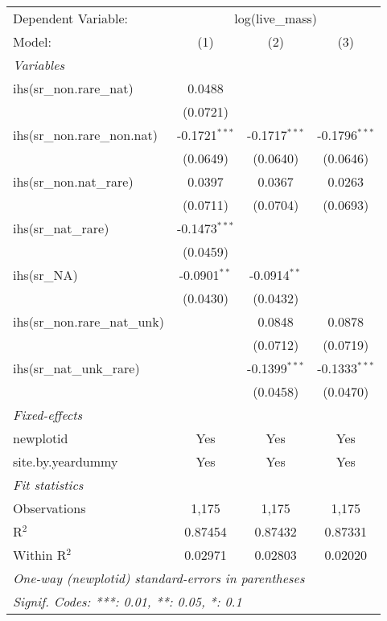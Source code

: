 \begin{tabular}{lccc}
\tabularnewline\midrule\midrule
Dependent Variable:&\multicolumn{3}{c}{log(live\_mass)}\\
Model:&(1) & (2) & (3)\\
\midrule \emph{Variables}&   &   &  \\
ihs(sr\_non.rare\_nat)&0.0488 &    &   \\
  &(0.0721) &    &   \\
ihs(sr\_non.rare\_non.nat)&-0.1721$^{***}$ & -0.1717$^{***}$ & -0.1796$^{***}$\\
  &(0.0649) & (0.0640) & (0.0646)\\
ihs(sr\_non.nat\_rare)&0.0397 & 0.0367 & 0.0263\\
  &(0.0711) & (0.0704) & (0.0693)\\
ihs(sr\_nat\_rare)&-0.1473$^{***}$ &    &   \\
  &(0.0459) &    &   \\
ihs(sr\_NA)&-0.0901$^{**}$ & -0.0914$^{**}$ &   \\
  &(0.0430) & (0.0432) &   \\
ihs(sr\_non.rare\_nat\_unk)&   & 0.0848 & 0.0878\\
  &   & (0.0712) & (0.0719)\\
ihs(sr\_nat\_unk\_rare)&   & -0.1399$^{***}$ & -0.1333$^{***}$\\
  &   & (0.0458) & (0.0470)\\
\midrule \emph{Fixed-effects}&   &   &  \\
newplotid & Yes & Yes & Yes\\
site.by.yeardummy & Yes & Yes & Yes\\
\midrule \emph{Fit statistics}&  & & \\
Observations & 1,175&1,175&1,175\\
R$^2$ & 0.87454&0.87432&0.87331\\
Within R$^2$ & 0.02971&0.02803&0.02020\\
\midrule\midrule\multicolumn{4}{l}{\emph{One-way (newplotid) standard-errors in parentheses}}\\
\multicolumn{4}{l}{\emph{Signif. Codes: ***: 0.01, **: 0.05, *: 0.1}}\\
\end{tabular}


